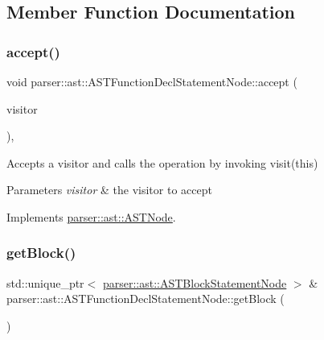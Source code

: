 \subsection{Member Function Documentation}
\mbox{\label{classparser_1_1ast_1_1ASTFunctionDeclStatementNode_ac7648205bc34d4cf7434274869d1b6a8}} 
\subsubsection{\texorpdfstring{accept()}{accept()}}
{\footnotesize\ttfamily void parser\+::ast\+::\+A\+S\+T\+Function\+Decl\+Statement\+Node\+::accept (\begin{DoxyParamCaption}\item[{\hyperlink{classvisitor_1_1Visitor}{visitor\+::\+Visitor} $\ast$}]{visitor }\end{DoxyParamCaption})\hspace{0.3cm}{\ttfamily [override]}, {\ttfamily [virtual]}}

Accepts a visitor and calls the operation by invoking {\ttfamily visit(this)} 
\begin{DoxyParams}{Parameters}
{\em visitor} & the visitor to accept \\
\hline
\end{DoxyParams}


Implements \hyperlink{classparser_1_1ast_1_1ASTNode_a3ff84fdfdbbc5c39b70b4d04c22e7dc3}{parser\+::ast\+::\+A\+S\+T\+Node}.

\mbox{\label{classparser_1_1ast_1_1ASTFunctionDeclStatementNode_ac219fd306035b1f58373b29f80309f4b}} 
\subsubsection{\texorpdfstring{get\+Block()}{getBlock()}}
{\footnotesize\ttfamily std\+::unique\+\_\+ptr$<$ \hyperlink{classparser_1_1ast_1_1ASTBlockStatementNode}{parser\+::ast\+::\+A\+S\+T\+Block\+Statement\+Node} $>$ \& parser\+::ast\+::\+A\+S\+T\+Function\+Decl\+Statement\+Node\+::get\+Block (\begin{DoxyParamCaption}{ }\end{DoxyParamCaption})}

